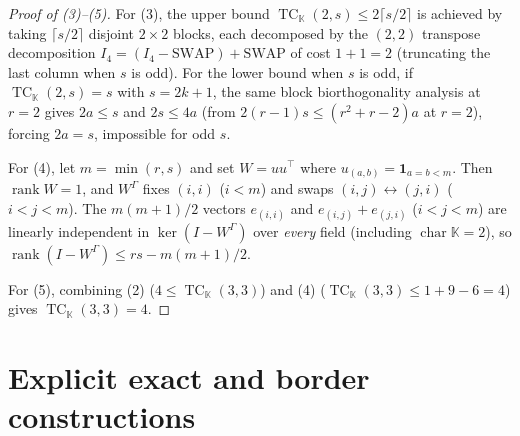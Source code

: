 \documentclass[11pt]{article}
\theoremstyle{definition}
\newcommand{\TC}{\operatorname{TC}}
\newcommand{\rk}{\operatorname{rank}}
\newcommand{\K}{\mathbb{K}}
\begin{document}
\begin{proof}[Proof of (3)--(5)]
For (3), the upper bound $\TC_\K(2, s) \le 2\lceil s/2\rceil$ is achieved by taking $\lceil s/2\rceil$ disjoint $2\times 2$ blocks, each decomposed by the $(2,2)$ transpose decomposition $I_4 = (I_4 - \mathrm{SWAP}) + \mathrm{SWAP}$ of cost $1 + 1 = 2$ (truncating the last column when $s$ is odd). For the lower bound when $s$ is odd, if $\TC_\K(2, s) = s$ with $s = 2k+1$, the same block biorthogonality analysis at $r = 2$ gives $2a \le s$ and $2s \le 4a$ (from $2(r-1)s \le (r^2+r-2)a$ at $r=2$), forcing $2a = s$, impossible for odd $s$.

For (4), let $m = \min(r,s)$ and set $W = u u^\top$ where $u_{(a,b)} = \mathbf{1}_{a = b < m}$. Then $\rk W = 1$, and $W^\Gamma$ fixes $(i,i)$ ($i < m$) and swaps $(i,j) \leftrightarrow (j,i)$ ($i < j < m$). The $m(m+1)/2$ vectors $e_{(i,i)}$ and $e_{(i,j)} + e_{(j,i)}$ ($i < j < m$) are linearly independent in $\ker(I - W^\Gamma)$ over \emph{every} field (including $\operatorname{char}\K = 2$), so $\rk(I - W^\Gamma) \le rs - m(m+1)/2$.

For (5), combining (2) ($4 \le \TC_\K(3,3)$) and (4) ($\TC_\K(3,3) \le 1 + 9 - 6 = 4$) gives $\TC_\K(3,3) = 4$.
\end{proof}

\section{Explicit exact and border constructions}\label{sec:witnesses}
\end{document}
